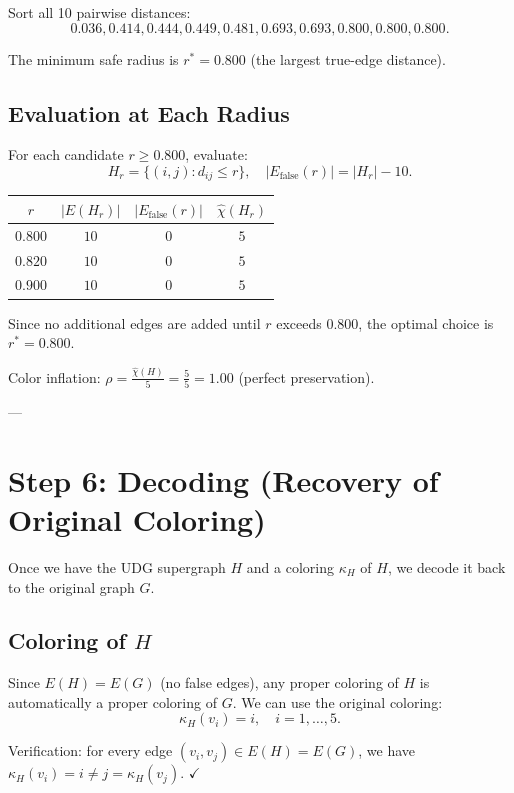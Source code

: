 \documentclass[11pt]{article}
\theoremstyle{definition}
\newcommand{\Efalse}{E_{\mathrm{false}}}
\newcommand{\chihat}{\widehat{\chi}}
\begin{document}
Sort all 10 pairwise distances:
\[
0.036, 0.414, 0.444, 0.449, 0.481, 0.693, 0.693, 0.800, 0.800, 0.800.
\]

The minimum safe radius is $r^* = 0.800$ (the largest true-edge distance).

\subsection{Evaluation at Each Radius}

For each candidate $r \ge 0.800$, evaluate:
\[
H_r = \{(i,j) : d_{ij} \le r\}, \quad |\Efalse(r)| = |H_r| - 10.
\]

\begin{center}
\begin{tabular}{cccc}
\toprule
$r$ & $|E(H_r)|$ & $|\Efalse(r)|$ & $\chihat(H_r)$ \\
\midrule
$0.800$ & $10$ & $0$ & $5$ \\
$0.820$ & $10$ & $0$ & $5$ \\
$0.900$ & $10$ & $0$ & $5$ \\
\bottomrule
\end{tabular}
\end{center}

Since no additional edges are added until $r$ exceeds $0.800$, the optimal choice is $r^* = 0.800$.

Color inflation: $\rho = \frac{\chihat(H)}{5} = \frac{5}{5} = 1.00$ (perfect preservation).

---

\section{Step 6: Decoding (Recovery of Original Coloring)}

Once we have the UDG supergraph $H$ and a coloring $\kappa_H$ of $H$, we decode it back to the original graph $G$.

\subsection{Coloring of $H$}

Since $E(H) = E(G)$ (no false edges), any proper coloring of $H$ is automatically a proper coloring of $G$. We can use the original coloring:
\[
\kappa_H(v_i) = i, \quad i = 1, \ldots, 5.
\]

Verification: for every edge $(v_i, v_j) \in E(H) = E(G)$, we have $\kappa_H(v_i) = i \neq j = \kappa_H(v_j)$. $\checkmark$
\end{document}
